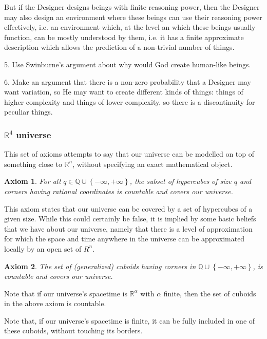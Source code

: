 \documentclass[a4paper
,draft
]{article}
\newcommand{\svn}[2][]{\todo[author=Virgil,color=red!25!white,#1]{#2}}
\def\reale{\mathbb{R}}
\def\rationale{\mathbb{Q}}
\newcommand{\multime}[1]{\left\{ #1 \right\}}
\newtheorem{axiom}{Axiom}
\begin{document}
But if the Designer designs beings with finite reasoning power,
then the Designer may also design an environment where these beings
can use their reasoning power effectively, i.e. an environment which,
at the level an which these beings usually function,
can be mostly understood by them, i.e. it has a finite
approximate description which allows the prediction of a non-trivial
number of things.

5. Use Swinburne's argument about why would God create human-like beings.

6. Make an argument that there is a non-zero probability that
a Designer may want variation, so He may want to create different
kinds of things: things of higher complexity and things of lower complexity,
so there is a discontinuity for peculiar things.

\subsubsection{$\reale^4$ universe}

This set of axioms attempts to say that our universe can be modelled
on top of something close to $\reale^n$, without specifying an exact
mathematical object.

\begin{axiom}\label{unitycovering}
  For all $q\in\rationale\cup\multime{-\infty, +\infty}$,
  the subset of hypercubes of size $q$ and corners
  having rational coordinates is countable and covers our universe.
\end{axiom}
\svn{Do I Need this axiom?}

This axiom states that our universe can be covered by a set of hypercubes
of a given size. While this could certainly be false, it is implied by some
basic beliefs that we have about our universe, namely that there is a
level of approximation for which the space and time anywhere in the universe
can be approximated locally by an open set of $R^n$.

\begin{axiom}\label{rationalcovering}
  The set of (generalized) cuboids having corners in
  $\rationale\cup\multime{-\infty, +\infty}$,
  is countable and covers our universe.
\end{axiom}

Note that if our universe's spacetime is $\reale^\alpha$ with
$\alpha$ finite, then the set of cuboids in the above axiom is countable.

Note that, if our universe's spacetime is finite, it can be fully included
in one of these cuboids, without touching its borders.
\end{document}

